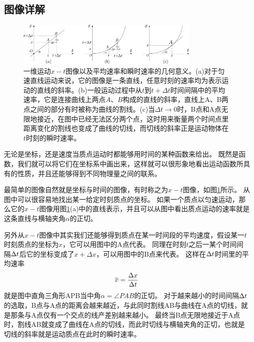 \subsection{图像详解}
\begin{figure}[htbp]
\begin{center}
\includegraphics[width=0.8\textwidth]{images/motion-x-t.pdf}
\caption{一维运动$x-t$图像以及平均速率和瞬时速率的几何意义。(a)对于匀速直线运动来说，它的图像是一条直线，任意时刻的速率均为表示运动的直线的斜率。(b)一般运动过程中从$t$到$t+\Delta t$时间间隔中的平均速率，它是连接曲线上两点$A、B$构成的直线的斜率，直线上A、B两点之间的部分有时被称为曲线的割线。(c)当$\Delta t\rightarrow 0$时，B点和A点无限地接近，在图中已经无法区分两个点，这时用来衡量两个时间点里距离变化的割线也变成了曲线的切线，而切线的斜率正是运动物体在$t$时刻的瞬时速率。}
\label{fig: motion一维运动$x-t$图像以及平均速率的几何意义}
\end{center}
\end{figure}
无论是坐标，还是速度当质点运动时都能够用时间的某种函数来给出。
既然是函数，我们就可以将它们在坐标系中画出来，这样就可以很形象地看出运动函数所具有的性质，并且还能够得到不同物理量之间的联系。


最简单的图像自然就是坐标与时间的图像，有时称之为$x-t$图像，如图\ref{fig: motion一维运动$x-t$图像以及平均速率的几何意义}所示。
从图中可以很容易地找出某一给定时刻质点的坐标。
如果一个质点以匀速运动，那么它的$x-t$图像用图\ref{fig: motion一维运动$x-t$图像以及平均速率的几何意义}(a)中的直线表示，并且可以从图中看出质点运动的速率就是这条直线与横轴夹角$\alpha$的正切。

另外从$x-t$图像中其实我们还能够得到质点在某一时间段的平均速度，假设某一$t$时刻质点的坐标为$x$，它可以用图中的A点代表。
同理在时刻$t$之后一某个时间间隔$\Delta t$后它的坐标变成了$x+\Delta x$，可以用图中的B点来代表。
这样在$\Delta t$时间里的平均速率
\begin{equation}
\overline{v} = \frac{\Delta x}{\Delta t}
\end{equation}
就是图中直角三角形APB当中角$\alpha = \angle PAB$的正切。
对于越来越小的时间间隔$\Delta t$的选取，B点与A点的距离会越来越近，与此同时割线AB与曲线在A点的切线，就是那条与A点仅有一个交点的线产差别越来越小。
最终当B点无限地接近于A点时，割线AB就变成了曲线在A点的切线，而此时切线与横轴夹角的正切，也就是切线的斜率就是运动质点在此时的瞬时速率。






